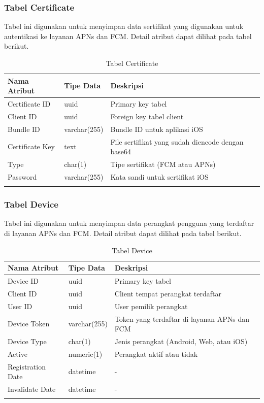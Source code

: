 \subsubsection{Tabel Certificate}
\par Tabel ini digunakan untuk menyimpan data sertifikat yang digunakan untuk autentikasi ke layanan APNs dan FCM. Detail atribut dapat dilihat pada tabel berikut.
\begin{longtable}{|p{2.5cm}|p{2cm}|p{4.5cm}|}
    \hline
    \textbf{Nama Atribut} & \textbf{Tipe Data} & \textbf{Deskripsi} \\ \hline
    Certificate ID & uuid & Primary key tabel \\ \hline
    Client ID & uuid & Foreign key tabel client \\ \hline
    Bundle ID & varchar(255) & Bundle ID untuk aplikasi iOS \\ \hline
    Certificate Key & text & File sertifikat yang sudah diencode dengan base64 \\ \hline
    Type & char(1) & Tipe sertifikat (FCM atau APNs) \\ \hline
    Password & varchar(255) & Kata sandi untuk sertifikat iOS \\ \hline
    \caption{Tabel Certificate}
\end{longtable}

\subsubsection{Tabel Device}
\par Tabel ini digunakan untuk menyimpan data perangkat pengguna yang terdaftar di layanan APNs dan FCM. Detail atribut dapat dilihat pada tabel berikut.
\begin{longtable}{|p{2.5cm}|p{2cm}|p{4.5cm}|}
    \hline
    \textbf{Nama Atribut} & \textbf{Tipe Data} & \textbf{Deskripsi} \\ \hline
    Device ID & uuid & Primary key tabel \\ \hline
    Client ID & uuid & Client tempat perangkat terdaftar \\ \hline
    User ID & uuid & User pemilik perangkat \\ \hline
    Device Token & varchar(255) & Token yang terdaftar di layanan APNs dan FCM \\ \hline
    Device Type & char(1) & Jenis perangkat (Android, Web, atau iOS) \\ \hline
    Active & numeric(1) & Perangkat aktif atau tidak \\ \hline
    Registration Date & datetime & - \\ \hline
    Invalidate Date & datetime & - \\ \hline
    \caption{Tabel Device}
\end{longtable}


